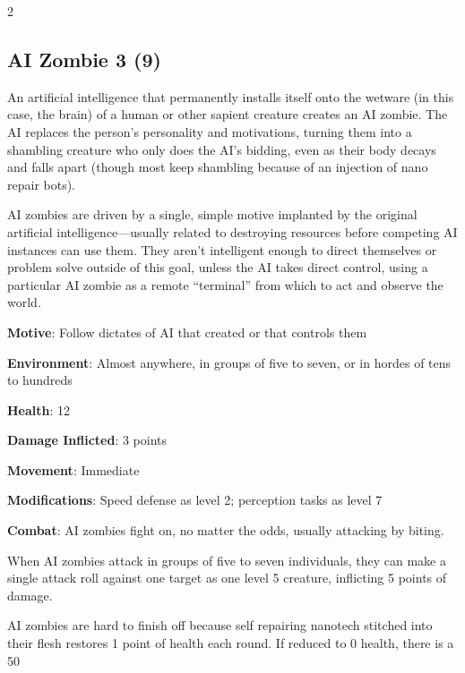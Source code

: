 \begin{multicols}{2}

\subsection{AI Zombie 3 (9)}

An artificial intelligence that permanently installs itself onto the wetware (in this case, the brain) of a human or other sapient creature creates an AI zombie. The AI replaces the person’s personality and motivations, turning them into a shambling creature who only does the AI’s bidding, even as their body decays and falls apart (though most keep shambling because of an injection of nano repair bots). 

AI zombies are driven by a single, simple motive implanted by the original artificial intelligence—usually related to destroying resources before competing AI instances can use them. They aren’t intelligent enough to direct themselves or problem solve outside of this goal, unless the AI takes direct control, using a particular AI zombie as a remote “terminal” from which to act and observe the world.
 
\textbf{Motive}: Follow dictates of AI that created or that controls them 

\textbf{Environment}: Almost anywhere, in groups of five to seven, or in hordes of tens to hundreds 

\textbf{Health}: 12 

\textbf{Damage Inflicted}: 3 points 

\textbf{Movement}: Immediate 

\textbf{Modifications}: Speed defense as level 2; perception tasks as level 7 

\textbf{Combat}: AI zombies fight on, no matter the odds, usually attacking by biting. 

When AI zombies attack in groups of five to seven individuals, they can make a single attack roll against one target as one level 5 creature, inflicting 5 points of damage. 

AI zombies are hard to finish off because self repairing nanotech stitched into their flesh restores 1 point of health each round. If reduced to 0 health, there is a 50%


\end{multicols}
